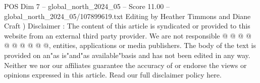 \begin{textsample}{POS Dim 7 – global\_north\_2024\_05 – Score 11.00 – global\_north\_2024\_05/107899619.txt}
Editing by Heather Timmons and Diane Craft ) Disclaimer : The content of this article is syndicated or provided to this website from an external third party provider.
We are not responsible @ @ @ @ @ @ @ @ @ @, entities, applications or media publishers.
The body of the text is provided on an"as is"and"as available"basis and has not been edited in any way.
Neither we nor our affiliates guarantee the accuracy of or endorse the views or opinions expressed in this article.
Read our full disclaimer policy here.

\end{textsample}
